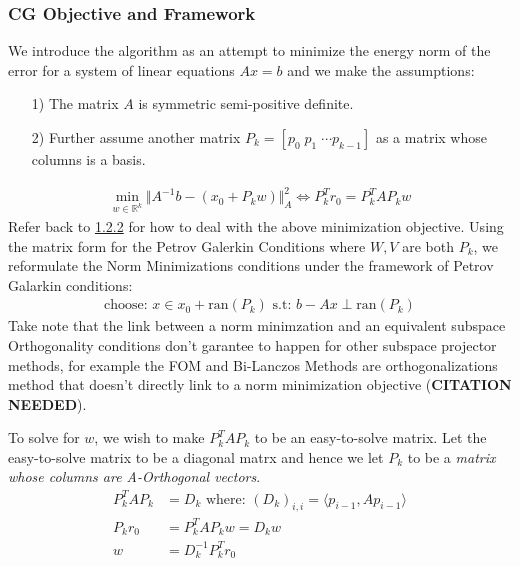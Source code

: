 \documentclass[]{article}
\theoremstyle{definition}
\begin{document}
        \subsubsection{CG Objective and Framework}
            We introduce the algorithm as an attempt to minimize the energy norm of the error for a system of linear equations $Ax = b$ and we make the assumptions: 
            \begin{itemize}
                \item [1)] The matrix $A$ is symmetric semi-positive definite.  
                \item [2)] Further assume another matrix $P_k = [p_0 \;p_1\;\cdots p_{k-1}]$ as a matrix whose columns is a basis.
            \end{itemize}
            \begin{align}
                \min_{w \in \mathbb{R}^k}\Vert 
                    A^{-1}b - (x_0 + P_kw)
                \Vert_A^2 \iff P^T_kr_0 = P_k^TAP_kw
            \end{align}
            Refer back to \hyperref[sec:1.4]{1.2.2} for how to deal with the above minimization objective. Using the matrix form for the Petrov Galerkin Conditions where $W, V$ are both $P_k$, we reformulate the Norm Minimizations conditions under the framework of Petrov Galarkin conditions: 
            \begin{align}
                \text{choose: }x \in x_0 + \text{ran}(P_k) \text{ s.t: } b - Ax \perp \text{ran}(P_k)    
            \end{align}
            Take note that the link between a norm minimzation and an equivalent subspace Orthogonality conditions don't garantee to happen for other subspace projector methods, for example the FOM and Bi-Lanczos Methods are orthogonalizations method that doesn't directly link to a norm minimization objective (\textbf{CITATION NEEDED}). 
            \par
            To solve for $w$, we wish to make $P_k^TAP_k$ to be an easy-to-solve matrix. Let the easy-to-solve matrix to be a diagonal matrx and hence we let $P_k$ to be a \textit{matrix whose columns are A-Orthogonal vectors}.
            \begin{align}
                P^T_kAP_k &= D_k \text{ where: } (D_k)_{i,i} = \langle p_{i - 1}, Ap_{i - 1}\rangle
                \\
                P_kr_0 &= P^T_kAP_kw = D_kw
                \\
                w &= D^{-1}_kP_k^Tr_0
            \end{align}
\end{document}
